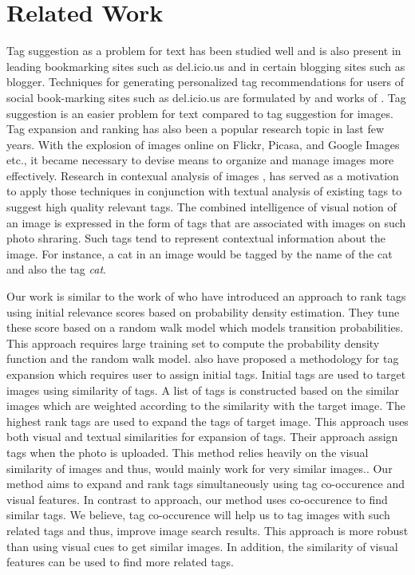 \documentclass[12pt]{article}
\begin{document}
\section{Related Work}
Tag suggestion as a problem for text has been studied well and is also present
in leading bookmarking sites such as del.icio.us and in certain blogging sites
such as blogger. Techniques for generating personalized tag recommendations for 
users of social book-marking sites such as del.icio.us are formulated by 
 and works of . Tag suggestion is
an easier problem for text compared to tag suggestion for images. Tag expansion 
and ranking has also been a popular research topic in last few years. With the 
explosion of images online on Flickr, Picasa, and Google Images etc., it 
became necessary to devise means to
organize and manage images more effectively. Research in contexual analysis of
images ,  has served as a 
motivation to apply those techniques in conjunction with textual analysis of
existing tags to suggest high quality relevant tags.
The combined intelligence of visual notion of an image is expressed in the form
of tags that are associated with images on such photo shraring. Such tags tend to represent contextual information about the image.
For instance, a cat in an image would be tagged by the name of the cat and also the tag \emph{cat}.

Our work is similar to the work of  who have introduced an approach to rank tags using initial relevance 
scores based on probability density estimation. They tune these score based on a random walk model
which models transition probabilities. This approach requires large training set to compute the 
probability density function and the random walk model.  also have 
proposed a methodology for tag expansion which requires user to assign initial tags. Initial tags
are used to target images using similarity of tags. A list of tags is constructed based on the similar images
which are weighted according to the similarity with the target image. The highest rank tags are used to 
expand the tags of target image. This approach uses both visual and textual similarities for expansion of tags.
Their approach assign tags when the photo is uploaded. This method relies heavily on the visual similarity
of images and thus, would mainly work for very similar images.. Our method aims to expand and rank tags simultaneously
using tag co-occurence and visual features. In contrast to  approach, 
our method uses co-occurence to find similar tags. We believe, tag co-occurence will help us to tag images with
such related tags and thus, improve image search results. This approach is more robust than using visual cues to
get similar images. In addition, the similarity of visual features can be used to find more related tags.
\end{document}
